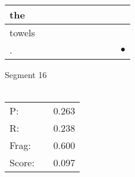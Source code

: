 \documentclass[landscape]{article}
\newcommand{\ssp}{\hspace{2pt}}
\newcommand{\mex}{\cellcolor{g}$\bullet$}
\begin{document}
\begin{tabular}{|l|p{10pt}|p{10pt}|p{10pt}|p{10pt}|p{10pt}|p{10pt}|p{10pt}|p{10pt}|p{10pt}|}
\hline
\ssp the \ssp&\hspace{2pt}&\hspace{2pt}&\hspace{2pt}&\hspace{2pt}&\hspace{2pt}&\hspace{2pt}&\hspace{2pt}&\hspace{2pt}&\hspace{2pt}\\
\hline
\ssp towels \ssp&\hspace{2pt}&\hspace{2pt}&\hspace{2pt}&\hspace{2pt}&\hspace{2pt}&\hspace{2pt}&\hspace{2pt}&\hspace{2pt}&\hspace{2pt}\\
\hline
\ssp \cellcolor{ref8}. \ssp&\hspace{2pt}&\hspace{2pt}&\hspace{2pt}&\hspace{2pt}&\hspace{2pt}&\hspace{2pt}&\hspace{2pt}&\hspace{2pt}&\hspace{2pt}\mex\\
\hline
\end{tabular}

\vspace{6pt}
\noindent Segment 16\\\\
\noindent\begin{tabular}{lm{12pt}r}
\hline
P:&&0.263\\
R:&&0.238\\
Frag:&&0.600\\
Score:&&0.097\\
\end{tabular}

\newpage
\end{document}
